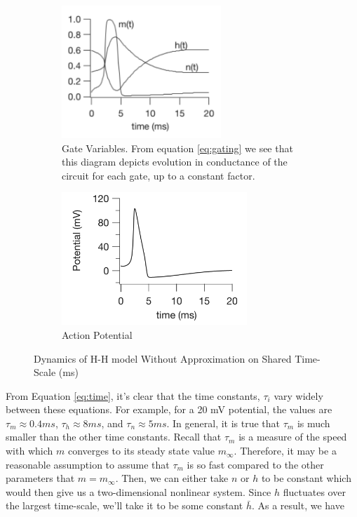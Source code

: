\documentclass[12]{book}
\newcommand\0{\mathbf{0}}
\newcommand\<{\langle}
\renewcommand\>{\rangle}
\begin{document}
\begin{figure}[h]
\centering
\begin{subfigure}{.5\textwidth}
	\centering
	\includegraphics[height=5cm]{keener1.png}
	\caption{Gate Variables. From equation \ref{eq:gating} we see that this diagram depicts evolution in conductance of the circuit for each gate, up to a constant factor.}
\end{subfigure}%
\begin{subfigure}{.5\textwidth}
	\centering
	\includegraphics[height=5cm]{keener2.png}
	\caption{Action Potential}
\end{subfigure}
	\caption{Dynamics of H-H model Without Approximation on Shared Time-Scale (ms)}
	\label{fig:keen}
\end{figure}


From Equation \ref{eq:time}, it's clear that the time constants, $\tau_i$ vary widely between these equations. For example, for a 20 mV potential, the values are $\tau_m \approx 0.4 ms$, $\tau_h \approx 8 ms$, and $\tau_n \approx 5 ms$. In general, it is true that $\tau_m$ is much smaller than the other time constants. Recall that $\tau_m$ is a measure of the speed with which $m$ converges to its steady state value $m_\infty$. Therefore, it may be a reasonable assumption to assume that $\tau_m$ is so fast compared to the other parameters that $m = m_\infty$. Then, we can either take $n$ or $h$ to be constant which would then give us a two-dimensional nonlinear system. Since $h$ fluctuates over the largest time-scale, we'll take it to be some constant $\bar{h}$. As a result, we have 
\end{document}
